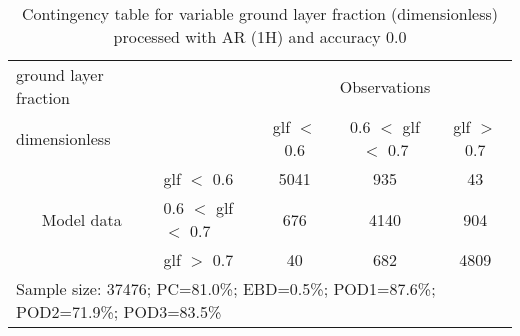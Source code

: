 \begin{table}[]
\begin{center}
\begin{tabular}{llccc}
\hline
{ground layer fraction}                                       &                                                    & \multicolumn{3}{c}{Observations}                 \\
{dimensionless}                                       &                             & glf $<$ 0.6   & 0.6 $<$ glf $<$ 0.7 & glf $>$ 0.7 \\
\hline
\multicolumn{1}{c}{\multirow{3}{*}{Model data}}  & glf $<$ 0.6             & 5041                & 935                       & 43              \\
                                                 & 0.6  $<$ glf $<$ 0.7 & 676                & 4140                       & 904              \\
                                                 & glf $>$ 0.7             & 40                & 682                       & 4809              \\
\hline
\multicolumn{5}{l}{Sample size: 37476; PC=81.0\%; EBD=0.5\%; POD1=87.6\%; POD2=71.9\%; POD3=83.5\%}
\end{tabular}
\end{center}
\caption{Contingency table for variable ground layer fraction (dimensionless) processed with AR (1H) and accuracy 0.0}
\label{tab:contingencyglfAFT}
\end{table}
